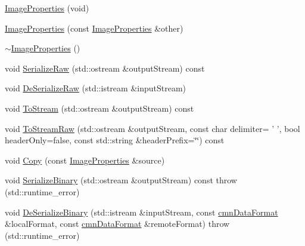\begin{DoxyCompactItemize}
\item 
\hyperlink{classsvl_filter_source_video_capture_types_1_1_image_properties_ad709e23a4f0e5f3856ac8626f7f8dc1d}{Image\-Properties} (void)
\item 
\hyperlink{classsvl_filter_source_video_capture_types_1_1_image_properties_ae71750e9c7aab4a95525cfcce65851cc}{Image\-Properties} (const \hyperlink{classsvl_filter_source_video_capture_types_1_1_image_properties}{Image\-Properties} \&other)
\item 
\hyperlink{classsvl_filter_source_video_capture_types_1_1_image_properties_a79bf3229bf3a2a3c8fa8196d538b6f40}{$\sim$\-Image\-Properties} ()
\item 
void \hyperlink{classsvl_filter_source_video_capture_types_1_1_image_properties_a0bfeb614b1031762721d8c06826dbebe}{Serialize\-Raw} (std\-::ostream \&output\-Stream) const 
\item 
void \hyperlink{classsvl_filter_source_video_capture_types_1_1_image_properties_a20f51efaa79f3d6d0a8571bebea9885f}{De\-Serialize\-Raw} (std\-::istream \&input\-Stream)
\item 
void \hyperlink{classsvl_filter_source_video_capture_types_1_1_image_properties_a035a3afa0326124323b4852da4c3cd3d}{To\-Stream} (std\-::ostream \&output\-Stream) const 
\item 
void \hyperlink{classsvl_filter_source_video_capture_types_1_1_image_properties_a9d922c804f763419207a013da79c2e0d}{To\-Stream\-Raw} (std\-::ostream \&output\-Stream, const char delimiter= ' ', bool header\-Only=false, const std\-::string \&header\-Prefix=\char`\"{}\char`\"{}) const 
\item 
void \hyperlink{classsvl_filter_source_video_capture_types_1_1_image_properties_a278b0b1474db20ab0ed7c7ce5b54375c}{Copy} (const \hyperlink{classsvl_filter_source_video_capture_types_1_1_image_properties}{Image\-Properties} \&source)
\item 
void \hyperlink{classsvl_filter_source_video_capture_types_1_1_image_properties_a016075e213c049c1967f5497d3e75e80}{Serialize\-Binary} (std\-::ostream \&output\-Stream) const   throw (std\-::runtime\-\_\-error)
\item 
void \hyperlink{classsvl_filter_source_video_capture_types_1_1_image_properties_aa7b6e4e87eaf82edaa8688f184896e16}{De\-Serialize\-Binary} (std\-::istream \&input\-Stream, const \hyperlink{classcmn_data_format}{cmn\-Data\-Format} \&local\-Format, const \hyperlink{classcmn_data_format}{cmn\-Data\-Format} \&remote\-Format)  throw (std\-::runtime\-\_\-error)

\end{DoxyCompactItemize}
